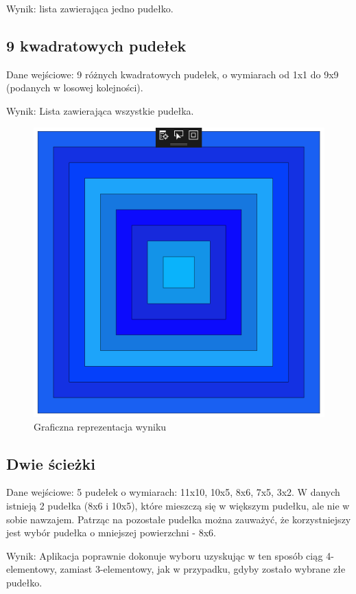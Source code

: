 \documentclass{article}
\begin{document}
Wynik: lista zawierająca jedno pudełko.

\subsection{9 kwadratowych pudełek}
Dane wejściowe: 9 różnych kwadratowych pudełek, o wymiarach od 1x1 do 9x9 (podanych w losowej kolejności). 

Wynik: Lista zawierająca wszystkie pudełka.
\begin{figure}[H]
\caption{Graficzna reprezentacja wyniku}
\includegraphics{square_boxes_res.png}
\end{figure}

\subsection{Dwie ścieżki}
Dane wejściowe: 5 pudełek o wymiarach: 11x10, 10x5, 8x6, 7x5, 3x2. W danych istnieją 2 pudełka (8x6 i 10x5), które mieszczą się w większym pudełku, ale nie w sobie nawzajem. Patrząc na pozostałe pudełka można zauważyć, że korzystniejszy jest wybór pudełka o mniejszej powierzchni - 8x6.

Wynik: Aplikacja poprawnie dokonuje wyboru uzyskując w ten sposób ciąg 4-elementowy, zamiast 3-elementowy, jak w przypadku, gdyby zostało wybrane złe pudełko.
\end{document}
